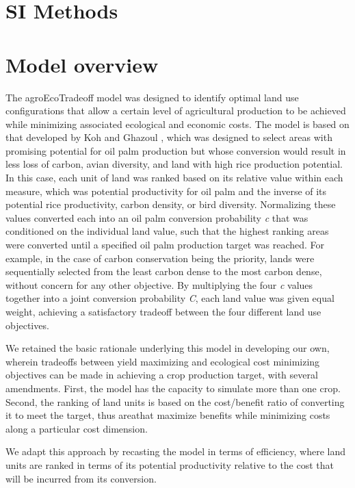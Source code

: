 \documentclass[a4paper]{article}
\begin{document}
\section*{\Large SI Methods}

\section*{\large Model overview}

The agroEcoTradeoff model was designed to identify optimal land use configurations that allow a certain level of agricultural production to be achieved while minimizing associated ecological and economic costs. The model is based on that developed by Koh and Ghazoul \citep{koh_spatially_2010}, which was designed to select areas with promising potential for oil palm production but whose conversion would result in less loss of carbon, avian diversity, and land with high rice production potential. In this case, each unit of land was ranked based on its relative value within each measure, which was potential productivity for oil palm and the inverse of its potential rice productivity, carbon density, or bird diversity. Normalizing these values converted each into an oil palm conversion probability \emph{c} that was conditioned on the individual land value, such that the highest ranking areas were converted until a specified oil palm production target was reached. For example, in the case of carbon conservation being the priority, lands were sequentially selected from the least carbon dense to the most carbon dense, without concern for any other objective. By multiplying the four \emph{c} values together into a joint conversion probability \emph{C}, each land value was given equal weight, achieving a satisfactory tradeoff between the four different land use objectives. 

We retained the basic rationale underlying this model in developing our own, wherein tradeoffs between yield maximizing and ecological cost minimizing objectives can be made in achieving a crop production target, with several amendments.  First, the model has the capacity to simulate more than one crop. Second, the ranking of land units is based on the cost/benefit ratio of converting it to meet the target, thus areathat maximize benefits while minimizing costs along a particular cost dimension.   


We adapt this approach by recasting the model in terms of efficiency, where land units are ranked in terms of its potential productivity relative to the cost that will be incurred from its conversion.  
 
\end{document}
